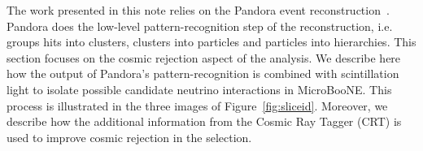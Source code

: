 The work presented in this note relies on the Pandora event reconstruction~\cite{bib:pandoraub}. Pandora does the low-level pattern-recognition step of the reconstruction, i.e. groups hits into clusters, clusters into particles and particles into hierarchies. This section focuses on the cosmic rejection aspect of the analysis. We describe here how the output of Pandora's pattern-recognition is combined with scintillation light to isolate possible candidate neutrino interactions in MicroBooNE. This process is illustrated in the three images of Figure~\ref{fig:sliceid}. Moreover, we describe how the additional information from the Cosmic Ray Tagger (CRT) is used to improve cosmic rejection in the \numu selection. 

